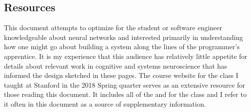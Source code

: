 
\subsection{Resources}


This document attempts to optimize for the student or software engineer knowledgeable about neural networks and interested primarily in understanding how one might go about building a system along the lines of the programmer's apprentice. It is my experience that this audience has relatively little appetite for details about relevant work in cognitive and systems neuroscience that has informed the design sketched in these pages. The course website for the class I taught at Stanford in the 2018 Spring quarter serves as an extensive resource for those reading this document. It includes all of the {} and {} for the class and I refer to it often in this document as a source of supplementary information.

